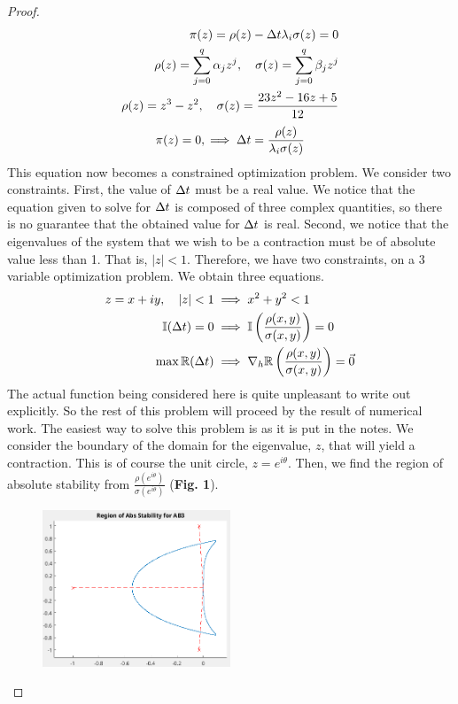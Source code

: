 \documentclass{article}
\begin{document}
\begin{enumerate}[label=\alph*)]
\begin{proof}
      \begin{align*}
        \pi(z) = \rho(z) - \Delta t\lambda_i\sigma(z) = 0\\
        \rho(z) = \sum_{j=0}^{q} \alpha_j z^j, \quad 
        \sigma(z) = \sum_{j=0}^{q} \beta_j z^j \\
        \rho(z) = z^3 - z^2, \quad \sigma(z) = \frac{23z^2 - 16z + 5}{12}
      \end{align*}   
      \begin{align}
        \pi(z)=0, \implies \Delta t = \frac{\rho(z)}{\lambda_i \sigma(z)}
      \end{align}
      This equation now becomes a constrained optimization problem. We consider
      two constraints. First, the value of $\Delta t$ must be a real value. We notice
      that the equation given to solve for $\Delta t$ is composed of three complex
      quantities, so there is no guarantee that the obtained value for $\Delta t$ is
      real. Second, we notice that the eigenvalues of the system that we wish to
      be a contraction must be of absolute value less than 1. That is, $|z| <
      1$. Therefore, we have two constraints, on a 3 variable optimization
      problem. We obtain three equations. 
      \begin{align}
        z = x + iy, \quad |z| < 1 &\implies x^2 + y^2 < 1\\
        \mathbb{I}(\Delta t) = 0 &\implies \mathbb{I}\left(\frac{\rho(x,
        y)}{\sigma(x, y)}\right) = 0\\
        \max \mathbb{R}(\Delta t) &\implies \nabla_h \mathbb{R}\left(\frac{\rho(x, y)}{\sigma(x,
        y)}\right) = \vec{0}
      \end{align}
      The actual function being considered here is quite unpleasant to write
      out explicitly. So the rest of this problem will proceed by the result of
      numerical work. The easiest way to solve this problem is as it is put in
      the notes. We consider the boundary of the domain for the eigenvalue, $z$,
      that will yield a contraction. This is of course the unit circle, $z =
      e^{i\theta}$. Then, we find the region of absolute stability from
      $\frac{\rho(e^{i\theta})}{\sigma(e^{i\theta})}$ (\textbf{Fig. 1}).
      \begin{figure}[h]
        \centering
        \includegraphics[width=0.5\textwidth]{1bAbsStabReg.png}

\end{figure}
\end{proof}
\end{enumerate}
\end{document}
